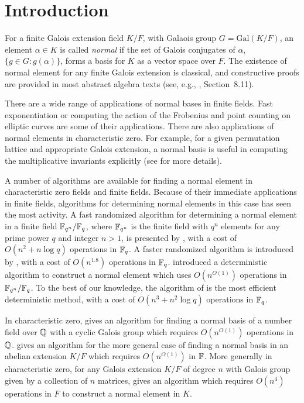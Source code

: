 \section{Introduction}

For a finite Galois extension field $K/F$, with Galaois group
$G = \mathrm{Gal}(K/F)$, an element $\alpha \in K$ is called \emph{normal}
if the set of Galois conjugates of $\alpha$, $\{g\in G: g(\alpha)\}$, forms
a basis for $K$ as a vector space over $F$. The existence of normal element
for any finite Galois extension is classical, and constructive proofs are
provided in most abstract algebra texts (see, e.g., \cite{Wae70},
Section~8.11).
 
There are a wide range of applications of normal bases in finite
fields. Fast exponentiation or computing the action of the Frobenius and
point counting on elliptic curves are some of their applications. There are
also applications of normal elements in characteristic zero. For example,
for a given permutation lattice and appropriate Galois extension, a normal
basis is useful in computing the multiplicative invariants explicitly (see
\cite{Armin} for more details).

A number of algorithms are available for finding a normal element in
characteristic zero fields and finite fields.  Because of their immediate
applications in finite fields, algorithms for determining normal elements
in this case has seen the most activity.  A fast randomized algorithm for
determining a normal element in a finite field $\mathbb{F}_{q^n}/\mathbb{F}_q$, where
$\mathbb{F}_{q^n}$ is the finite field with $q^n$ elements for any prime power
$q$ and integer $n>1$, is presented by , with a cost of
$O(n^2+n\log q)$ operations in $\mathbb{F}_q$.  A faster randomized algorithm is
introduced by , with a cost of $O(n^{1.8})$ operations in
$\mathbb{F}_q$.   introduced a deterministic algorithm to
construct a normal element which uses $O(n^{O(1)})$ operations in
$\mathbb{F}_{q^n}/\mathbb{F}_q$.  To the best of our knowledge, the algorithm of
 is the most efficient deterministic method, with a cost of
$O(n^3+n^2\log q)$ operations in $\mathbb{F}_q$.

In characteristic zero,  gives an algorithm for finding a
normal basis of a number field over $\mathbb{Q}$ with a cyclic Galois group which
requires $O(n^{O(1)})$ operations in $\mathbb{Q}$.   gives an
algorithm for the more general case of finding a normal basis in an abelian
extension $K/F$ which requires $O(n^{O(1)})$ in $\mathbb{F}$.  More generally in
characteristic zero, for any Galois extension $K/F$ of degree $n$ with
Galois group given by a collection of $n$ matrices,  gives
an algorithm which requires $O(n^4)$ operations in $F$ to construct a
normal element in $K$.

